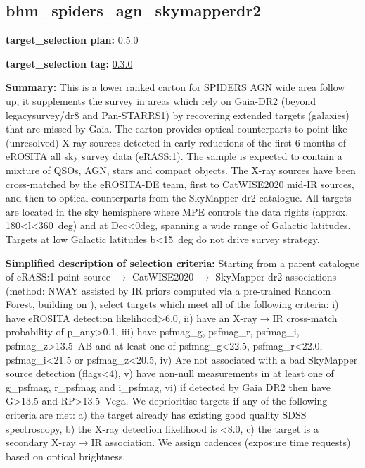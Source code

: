 \hypertarget{bhm_spiders_agn_skymapperdr2_plan0.5.0}{%
\subsection{bhm\_spiders\_agn\_skymapperdr2}\label{bhm_spiders_agn_skymapperdr2_plan0.5.0}}

\noindent\textbf{target\_selection plan:} 0.5.0

\noindent\textbf{target\_selection tag:}
\href{https://github.com/sdss/target_selection/tree/0.3.0/}{0.3.0}

\noindent\textbf{Summary:} This is a lower ranked carton for SPIDERS AGN wide
area follow up, it supplements the survey in areas which rely on
Gaia-DR2 (beyond legacysurvey/dr8 and Pan-STARRS1) by recovering
extended targets (galaxies) that are missed by Gaia. The carton provides
optical counterparts to point-like (unresolved) X-ray sources detected
in early reductions of the first 6-months of eROSITA all sky survey data
(eRASS:1). The sample is expected to contain a mixture of QSOs, AGN,
stars and compact objects. The X-ray sources have been cross-matched by
the eROSITA-DE team, first to
CatWISE2020 \citep{Marocco2021}
mid-IR sources, and then to optical counterparts from the
SkyMapper-dr2 \citep{Onken2019}
catalogue. All targets are located in the sky hemisphere where MPE
controls the data rights (approx. 180\textless{}l\textless{}360~deg) and
at Dec\textless{}0deg, spanning a wide range of Galactic latitudes.
Targets at low Galactic latitudes \textbar{}b\textbar{}\textless{}15~deg
do not drive survey strategy.

\noindent\textbf{Simplified description of selection criteria:} Starting from a
parent catalogue of eRASS:1 point source $\rightarrow$ CatWISE2020 $\rightarrow$ SkyMapper-dr2
associations (method: NWAY assisted by IR priors computed via a
pre-trained Random Forest, building on
\citealt{Salvato2022}), select targets which meet all of the following criteria:
i) have eROSITA detection likelihood\textgreater{}6.0, ii) have an
X-ray$\rightarrow$IR cross-match probability of p\_any\textgreater{}0.1, iii) have
psfmag\_g, psfmag\_r, psfmag\_i, psfmag\_z\textgreater{}13.5~AB and at
least one of psfmag\_g\textless{}22.5, psfmag\_r\textless{}22.0,
psfmag\_i\textless{}21.5 or psfmag\_z\textless{}20.5, iv) Are not
associated with a bad SkyMapper source detection (flags\textless{}4), v)
have non-null measurements in at least one of g\_psfmag, r\_psfmag and
i\_psfmag, vi) if detected by Gaia DR2 then have G\textgreater{}13.5 and
RP\textgreater{}13.5~Vega. We deprioritise targets if any of the
following criteria are met: a) the target already has existing good
quality SDSS spectroscopy, b) the X-ray detection likelihood is
\textless{}8.0, c) the target is a secondary X-ray$\rightarrow$IR association. We
assign cadences (exposure time requests) based on optical brightness.


